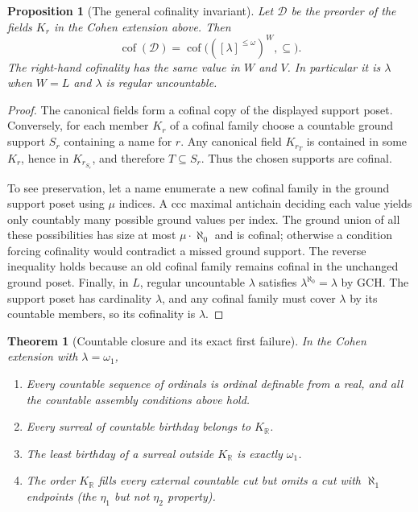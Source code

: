 \documentclass[11pt,a4paper]{article}
\numberwithin{equation}{section}
\newtheorem{theorem}{Theorem}[section]
\newtheorem{proposition}[proposition]{Proposition}
\theoremstyle{definition}
\theoremstyle{remark}
\newcommand{\R}{\mathbb R}
\newcommand{\KR}{K_{\R}}
\begin{document}
\begin{proposition}[The general cofinality invariant]
Let $\mathscr D$ be the preorder of the fields $K_r$ in
the Cohen extension above.  Then
\[
 \operatorname{cof}(\mathscr D)
 =\operatorname{cof}\bigl(([\lambda]^{\le\omega})^W,\subseteq\bigr).
\]
The right-hand cofinality has the same value in $W$ and $V$.
In particular it is $\lambda$ when $W=L$ and $\lambda$ is regular
uncountable.
\end{proposition}

\begin{proof}
The canonical fields form a cofinal copy of the displayed support
poset.  Conversely, for each member $K_r$ of a cofinal
family choose a countable ground support $S_r$ containing a name for
$r$.  Any canonical field $K_{r_T}$ is contained in some
$K_r$, hence in $K_{r_{S_r}}$, and therefore
$T\subseteq S_r$.  Thus the chosen supports are cofinal.

To see preservation, let a name enumerate a new cofinal family in the
ground support poset using $\mu$ indices.  A ccc maximal antichain
deciding each value yields only countably many possible ground values
per index.  The ground union of all these possibilities has size at
most $\mu\cdot\aleph_0$ and is cofinal; otherwise a condition forcing
cofinality would contradict a missed ground support.  The reverse
inequality holds because an old cofinal family remains cofinal in
the unchanged ground poset.  Finally, in $L$, regular uncountable
$\lambda$ satisfies $\lambda^{\aleph_0}=\lambda$ by GCH.  The
support poset has cardinality $\lambda$, and any cofinal family must
cover $\lambda$ by its countable members, so its cofinality is
$\lambda$.
\end{proof}

\begin{theorem}[Countable closure and its exact first failure]\label{dsn:rp:thm:cohen-threshold}
In the Cohen extension with $\lambda=\omega_1$,
\begin{enumerate}
\item Every countable sequence of ordinals is ordinal definable from a
real, and all the countable assembly conditions above hold.
\item Every surreal of countable birthday belongs to
$\KR$.
\item The least birthday of a surreal outside
$\KR$ is exactly $\omega_1$.
\item The order $\KR$ fills every external countable cut but omits a cut with $\aleph_1$ endpoints (the $\eta_1$ but not $\eta_2$ property).
\end{enumerate}
\end{theorem}
\end{document}
